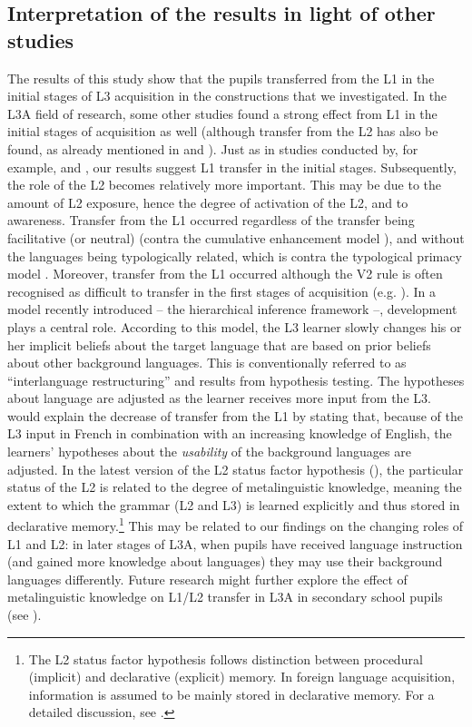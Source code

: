 \documentclass[output=paper]{langsci/langscibook}
\begin{document}
\subsection{Interpretation of the results in light of other studies}%
\label{sec:stadt:5.2}
The results of this study show that the pupils transferred from the L1 in the initial stages of L3 acquisition in the constructions that we investigated. In the L3A field of research, some other studies found a strong effect from L1 in the initial stages of acquisition as well (although transfer from the L2 has also be found, as already mentioned in  and ). Just as in studies conducted by, for example, \citet{NaRanongLeung2009} and \citet{Hermas2010, Hermas2014Morphosyntax, Hermas2014Relatives}, our results suggest L1 transfer in the initial stages. Subsequently, the role of the L2 becomes relatively more important. This may be due to the amount of L2 exposure, hence the degree of activation of the L2, and to awareness.
Transfer from the L1 occurred regardless of the transfer being facilitative (or neutral) (contra the cumulative enhancement model \citealt{FlynnEtAl2004}), and without the languages being typologically related, which is contra the typological primacy model \citep{Rothman2010, Rothman2011, Rothman2015}. Moreover, transfer from the L1 occurred although the V2 rule is often recognised as difficult to transfer in the first stages of acquisition (e.g. \citealt{Pienemann1998}). In a model recently introduced – the hierarchical inference framework \citep{PajakEtAl2016} –, development plays a central role. According to this model, the L3 learner slowly changes his or her implicit beliefs about the target language that are based on prior beliefs about other background languages. This is conventionally referred to as ``interlanguage restructuring'' and results from hypothesis testing. The hypotheses about language are adjusted as the learner receives more input from the L3. \citet{PajakEtAl2016} would explain the decrease of transfer from the L1 by stating that, because of the L3 input in French in combination with an increasing knowledge of English, the learners’ hypotheses about the \textit{usability} of the background languages are adjusted.
In the latest version of the L2 status factor hypothesis (\citealt{BardelSánchez2017}), the particular status of the L2 is related to the degree of metalinguistic knowledge, meaning the extent to which the grammar (L2 and L3) is learned explicitly and thus stored in declarative memory.\footnote{The L2 status factor hypothesis follows  distinction between procedural (implicit) and declarative (explicit) memory. In foreign language acquisition, information is assumed to be mainly stored in declarative memory. For a detailed discussion, see \citet{BardelSánchez2017}.} This may be related to our findings on the changing roles of L1 and L2: in later stages of L3A, when pupils have received language instruction (and gained more knowledge about languages) they may use their background languages differently. Future research might further explore the effect of metalinguistic knowledge on L1/L2 transfer in L3A in secondary school pupils (see \citealt{FalkEtAl2015}).
\end{document}
